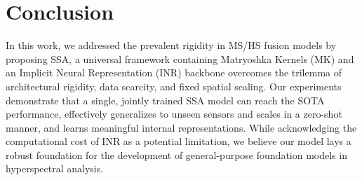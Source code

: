 \section{Conclusion}
\label{sec:conclusion}
In this work, we addressed the prevalent rigidity in MS/HS fusion models by proposing SSA, a universal framework containing Matryoshka Kernels (MK) and an Implicit Neural Representation (INR) backbone overcomes the trilemma of architectural rigidity, data scarcity, and fixed spatial scaling. Our experiments demonstrate that a single, jointly trained SSA model can reach the SOTA performance, effectively generalizes to unseen sensors and scales in a zero-shot manner, and learns meaningful internal representations. While acknowledging the computational cost of INR as a potential limitation, we believe our model lays a robust foundation for the development of general-purpose foundation models in hyperspectral analysis. 